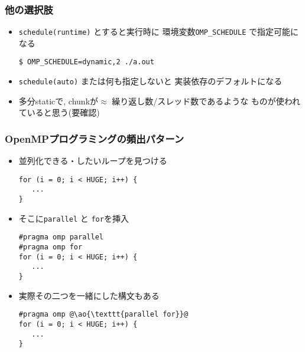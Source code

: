 \documentclass[10pt,dvipdfmx]{beamer}
\newcommand{\ao}[1]{{\color{blue}#1}}
\begin{document}
\begin{frame}[fragile]
\frametitle{他の選択肢}
\begin{itemize}
\item {\tt schedule(\ao{runtime})} とすると実行時に
  環境変数{\tt OMP\_SCHEDULE} で指定可能になる
\begin{lstlisting}
$ OMP_SCHEDULE=dynamic,2 ./a.out
\end{lstlisting} %

\item {\tt schedule(\ao{auto})} または何も指定しないと
  実装依存のデフォルトになる

\item 多分staticで, chunkが$\approx$ 繰り返し数/スレッド数であるような
  ものが使われていると思う(要確認)


\end{itemize}
\end{frame}

\begin{frame}[fragile]
\frametitle{OpenMPプログラミングの頻出パターン}
\begin{itemize}
\item 並列化できる・したいループを見つける
\begin{lstlisting}
for (i = 0; i < HUGE; i++) {
   ...    
}      
\end{lstlisting}
\item そこに\texttt{parallel} と \texttt{for}を挿入
\begin{lstlisting}
#pragma omp parallel
#pragma omp for
for (i = 0; i < HUGE; i++) {
   ...    
}      
\end{lstlisting}

\item 実際その二つを一緒にした構文もある
\begin{lstlisting}
#pragma omp @\ao{\texttt{parallel for}}@
for (i = 0; i < HUGE; i++) {
   ...    
}      
\end{lstlisting}
\end{itemize}
\end{frame}
\end{document}
